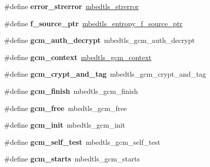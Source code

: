 \begin{DoxyCompactItemize}
\#define {\bfseries error\+\_\+strerror}~\mbox{\hyperlink{error_8h_a8c41c149b77a4807115b19c2af858558}{mbedtls\+\_\+strerror}}
\item 
\mbox{\label{compat-1_83_8h_ab96d5c13884254ceef9533a3be339ae5}} 
\#define {\bfseries f\+\_\+source\+\_\+ptr}~\mbox{\hyperlink{entropy_8h_a2168f0720e2e869e440fd7fa35c941bd}{mbedtls\+\_\+entropy\+\_\+f\+\_\+source\+\_\+ptr}}
\item 
\mbox{\label{compat-1_83_8h_ab296fb010ce893666652479688c6f91f}} 
\#define {\bfseries gcm\+\_\+auth\+\_\+decrypt}~mbedtls\+\_\+gcm\+\_\+auth\+\_\+decrypt
\item 
\mbox{\label{compat-1_83_8h_adc35cb8f76724c511df6ee4f2adb2c9c}} 
\#define {\bfseries gcm\+\_\+context}~\mbox{\hyperlink{structmbedtls__gcm__context}{mbedtls\+\_\+gcm\+\_\+context}}
\item 
\mbox{\label{compat-1_83_8h_afddb74e3ee10f1f44330a85733735290}} 
\#define {\bfseries gcm\+\_\+crypt\+\_\+and\+\_\+tag}~mbedtls\+\_\+gcm\+\_\+crypt\+\_\+and\+\_\+tag
\item 
\mbox{\label{compat-1_83_8h_af20203b68d21840dc265a477f7ff7d5c}} 
\#define {\bfseries gcm\+\_\+finish}~mbedtls\+\_\+gcm\+\_\+finish
\item 
\mbox{\label{compat-1_83_8h_ace477fbdb2d3336f822d94d4abb1b0dc}} 
\#define {\bfseries gcm\+\_\+free}~mbedtls\+\_\+gcm\+\_\+free
\item 
\mbox{\label{compat-1_83_8h_ae8ba1a374c0958d6c96c012999aed004}} 
\#define {\bfseries gcm\+\_\+init}~mbedtls\+\_\+gcm\+\_\+init
\item 
\mbox{\label{compat-1_83_8h_a3d678aecea75edd65f11a0b5ef192e44}} 
\#define {\bfseries gcm\+\_\+self\+\_\+test}~mbedtls\+\_\+gcm\+\_\+self\+\_\+test
\item 
\mbox{\label{compat-1_83_8h_a30b10310da1b2ba23d4c7fe92cb23541}} 
\#define {\bfseries gcm\+\_\+starts}~mbedtls\+\_\+gcm\+\_\+starts
\item 
\mbox{\label{compat-1_83_8h_a3a06c1090b5fdf61d292c496397592a6}} 

\end{DoxyCompactItemize}
